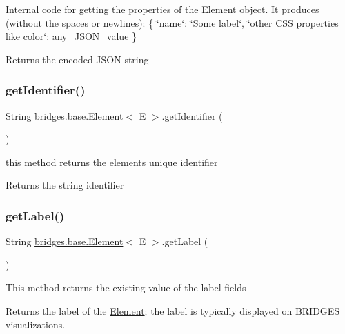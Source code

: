 Internal code for getting the properties of the \mbox{\hyperlink{classbridges_1_1base_1_1_element}{Element}} object. It produces (without the spaces or newlines)\+: \{ \char`\"{}name\char`\"{}\+: \char`\"{}\+Some label\char`\"{}, \char`\"{}other C\+S\+S properties like color\char`\"{}\+: any\+\_\+\+J\+S\+O\+N\+\_\+value \} \begin{DoxyReturn}{Returns}
the encoded J\+S\+ON string 
\end{DoxyReturn}
\mbox{\label{classbridges_1_1base_1_1_element_ad5496f568b4cca3909800eceea5fb47d}} 
\subsubsection{\texorpdfstring{get\+Identifier()}{getIdentifier()}}
{\footnotesize\ttfamily String \mbox{\hyperlink{classbridges_1_1base_1_1_element}{bridges.\+base.\+Element}}$<$ E $>$.get\+Identifier (\begin{DoxyParamCaption}{ }\end{DoxyParamCaption})}

this method returns the element\textquotesingle{}s unique identifier \begin{DoxyReturn}{Returns}
the string identifier 
\end{DoxyReturn}
\mbox{\label{classbridges_1_1base_1_1_element_a5c831a0238de487765f6021a887f1542}} 
\subsubsection{\texorpdfstring{get\+Label()}{getLabel()}}
{\footnotesize\ttfamily String \mbox{\hyperlink{classbridges_1_1base_1_1_element}{bridges.\+base.\+Element}}$<$ E $>$.get\+Label (\begin{DoxyParamCaption}{ }\end{DoxyParamCaption})}

This method returns the existing value of the label fields

\begin{DoxyReturn}{Returns}
the label of the \mbox{\hyperlink{classbridges_1_1base_1_1_element}{Element}}; the label is typically displayed on B\+R\+I\+D\+G\+ES visualizations. 
\end{DoxyReturn}
\mbox{\label{classbridges_1_1base_1_1_element_ae32deb37d1ad95d2fdfaa616062f319d}} 
